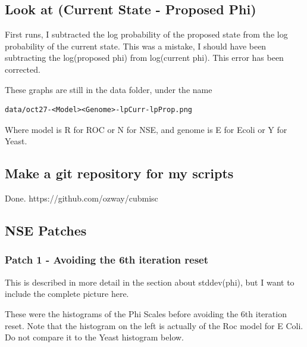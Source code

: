 \newpage
\subsection{Look at (Current State - Proposed Phi)}

First runs, I subtracted the log probability of the proposed state from the log probability of the current state. This was a mistake, I should have been subtracting the log(proposed phi) from log(current phi). This error has been corrected. 

These graphs are still in the data folder, under the name 
\begin{verbatim}
data/oct27-<Model><Genome>-lpCurr-lpProp.png
\end{verbatim}
Where model is R for ROC or N for NSE, and genome is E for Ecoli or Y for Yeast.





\newpage
\subsection{Make a git repository for my scripts}

Done. https://github.com/ozway/cubmisc







\subsection{NSE Patches}

\subsubsection{Patch 1 - Avoiding the 6th iteration reset}

This is described in more detail in the section about stddev(phi), but I want to include the complete picture here.

These were the histograms of the Phi Scales before avoiding the 6th iteration reset. Note that the histogram on the left is actually of the Roc model for E Coli. Do not compare it to the Yeast histogram below.

